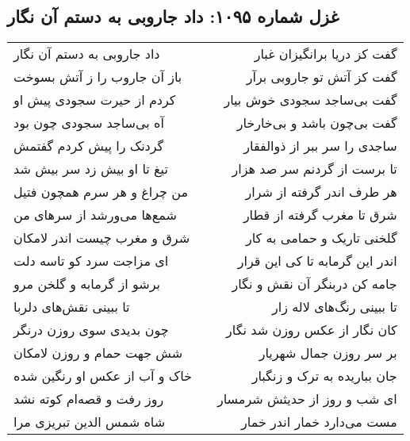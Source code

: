 \begin{center}
\section*{غزل شماره ۱۰۹۵: داد جاروبی به دستم آن نگار}
\label{sec:1095}
\begin{longtable}{l p{0.5cm} r}
داد جاروبی به دستم آن نگار
&&
گفت کز دریا برانگیزان غبار
\\
باز آن جاروب را ز آتش بسوخت
&&
گفت کز آتش تو جاروبی برآر
\\
کردم از حیرت سجودی پیش او
&&
گفت بی‌ساجد سجودی خوش بیار
\\
آه بی‌ساجد سجودی چون بود
&&
گفت بی‌چون باشد و بی‌خارخار
\\
گردنک را پیش کردم گفتمش
&&
ساجدی را سر ببر از ذوالفقار
\\
تیغ تا او بیش زد سر بیش شد
&&
تا برست از گردنم سر صد هزار
\\
من چراغ و هر سرم همچون فتیل
&&
هر طرف اندر گرفته از شرار
\\
شمع‌ها می‌ورشد از سرهای من
&&
شرق تا مغرب گرفته از قطار
\\
شرق و مغرب چیست اندر لامکان
&&
گلخنی تاریک و حمامی به کار
\\
ای مزاجت سرد کو تاسه دلت
&&
اندر این گرمابه تا کی این قرار
\\
برشو از گرمابه و گلخن مرو
&&
جامه کن دربنگر آن نقش و نگار
\\
تا ببینی نقش‌های دلربا
&&
تا ببینی رنگ‌های لاله زار
\\
چون بدیدی سوی روزن درنگر
&&
کان نگار از عکس روزن شد نگار
\\
شش جهت حمام و روزن لامکان
&&
بر سر روزن جمال شهریار
\\
خاک و آب از عکس او رنگین شده
&&
جان بباریده به ترک و زنگبار
\\
روز رفت و قصه‌ام کوته نشد
&&
ای شب و روز از حدیثش شرمسار
\\
شاه شمس الدین تبریزی مرا
&&
مست می‌دارد خمار اندر خمار
\\
\end{longtable}
\end{center}
